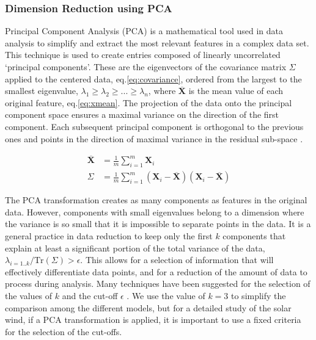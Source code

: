 \subsubsection{Dimension Reduction using PCA}
Principal Component Analysis (PCA) is a mathematical tool used in data analysis to simplify and extract the most relevant features in a complex data set. This technique is used to create entries composed of linearly uncorrelated `principal components'. These are the eigenvectors of the covariance matrix $\Sigma$ applied to the centered data, eq.\eqref{eq:covariance}, ordered from the largest to the smallest eigenvalue, $\lambda_1 \ge \lambda_2 \ge ... \ge \lambda_n$, where $\overline{\boldsymbol{X}}$ is the mean value of each original feature, eq.\eqref{eq:xmean}. The projection of the data onto the principal component space ensures a maximal variance on the direction of the first component. Each subsequent principal component is orthogonal to the previous ones and points in the direction of maximal variance in the residual sub-space \citep{Shlens2014}.

\begin{align}
\overline{\boldsymbol{X}} & = \frac{1}{m} \sum_{i=1}^{m} \boldsymbol{X}_i \label{eq:xmean} \\
\Sigma & = \frac{1}{m} \sum_{i=1}^{m} \left( \boldsymbol{X}_i - \overline{\boldsymbol{X}} \right)\left( \boldsymbol{X}_i - \overline{\boldsymbol{X}} \right) \label{eq:covariance}
\end{align}

The PCA transformation creates as many components as features in the original data. However, components with small eigenvalues belong to a dimension where the variance is so small that it is impossible to separate points in the data. It is a general practice in data reduction to keep only the first $k$ components that explain at least a significant portion of the total variance of the data, $\lambda_{i=1..k}/\text{Tr}(\Sigma) > \epsilon$. This allows for a selection of information that will effectively differentiate data points, and for a reduction of the amount of data to process during analysis. Many techniques have been suggested for the selection of the values of $k$ and the cut-off $\epsilon$ \citep{Rea2016}. We use the value of $k=3$ to simplify the comparison among the different models, but for a detailed study of the solar wind, if a PCA transformation is applied, it is important to use a fixed criteria for the selection of the cut-offs.

